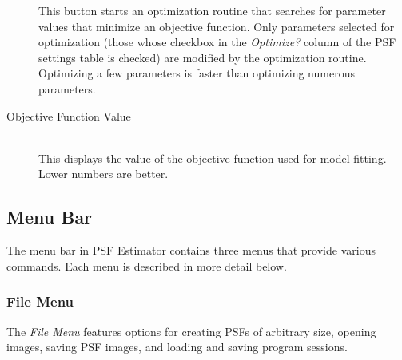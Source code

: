 \documentclass[11pt,titlepage,twoside]{article}
\begin{document}
\begin{description}
  This button starts an optimization routine that searches for parameter values that minimize an objective function. Only parameters selected for optimization (those whose checkbox in the \emph{Optimize?} column of the PSF settings table is checked) are modified by the optimization routine. Optimizing a few parameters is faster than optimizing numerous parameters.
  
  \item[Objective Function Value] \hfill \\
  
  This displays the value of the objective function used for model fitting. Lower numbers are better.

\end{description}




\subsection{Menu Bar}

The menu bar in PSF Estimator contains three menus that provide various commands. Each menu is described in more detail below.

\subsubsection{File Menu}

The \emph{File Menu} features options for creating PSFs of arbitrary size, opening images, saving PSF images, and loading and saving program sessions.
\end{document}
